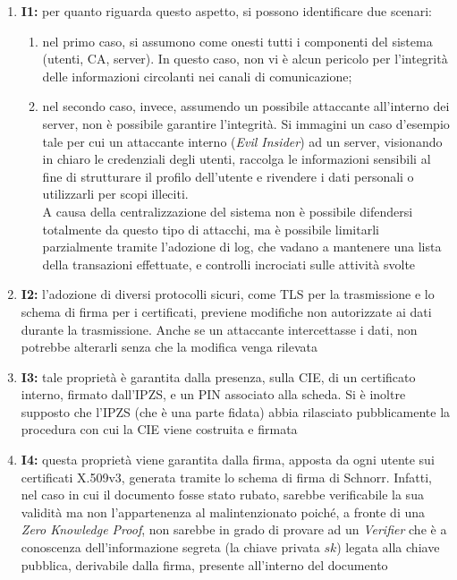         \begin{enumerate}
            \item \textbf{I1:} per quanto riguarda questo aspetto, si possono identificare due scenari:
                \begin{enumerate}
                    \item nel primo caso, si assumono come onesti tutti i componenti del sistema (utenti, CA, server).
                    In questo caso, non vi è alcun pericolo per l'integrità delle informazioni circolanti nei canali di comunicazione;

                    \item nel secondo caso, invece, assumendo un possibile attaccante all'interno dei server, non è possibile garantire l'integrità.
                    Si immagini un caso d'esempio tale per cui un attaccante interno (\textit{Evil Insider}) ad un server, visionando in chiaro le credenziali degli utenti, raccolga le informazioni sensibili al fine di strutturare il profilo dell'utente e rivendere i dati personali o utilizzarli per scopi illeciti. \\
                    A causa della centralizzazione del sistema non è possibile difendersi totalmente da questo tipo di attacchi, ma è possibile limitarli parzialmente tramite l'adozione di log, che vadano a mantenere una lista della transazioni effettuate, e controlli incrociati sulle attività svolte
                \end{enumerate}
            
            \item \textbf{I2:} l'adozione di diversi protocolli sicuri, come TLS per la trasmissione e lo schema di firma per i certificati, previene modifiche non autorizzate ai dati durante la trasmissione.
            Anche se un attaccante intercettasse i dati, non potrebbe alterarli senza che la modifica venga rilevata

            \item \textbf{I3:} tale proprietà è garantita dalla presenza, sulla CIE, di un certificato interno, firmato dall'IPZS, e un PIN associato alla scheda.
            Si è inoltre supposto che l'IPZS (che è una parte fidata) abbia rilasciato pubblicamente la procedura con cui la CIE viene costruita e firmata

            \item \textbf{I4:} questa proprietà viene garantita dalla firma, apposta da ogni utente sui certificati X.509v3, generata tramite lo schema di firma di Schnorr.
            Infatti, nel caso in cui il documento fosse stato rubato, sarebbe verificabile la sua validità ma non l'appartenenza al malintenzionato poiché, a fronte di una \textit{Zero Knowledge Proof}, non sarebbe in grado di provare ad un \textit{Verifier} che è a conoscenza dell’informazione segreta (la chiave privata $sk$) legata alla chiave pubblica, derivabile dalla firma, presente all’interno del documento
        \end{enumerate}

